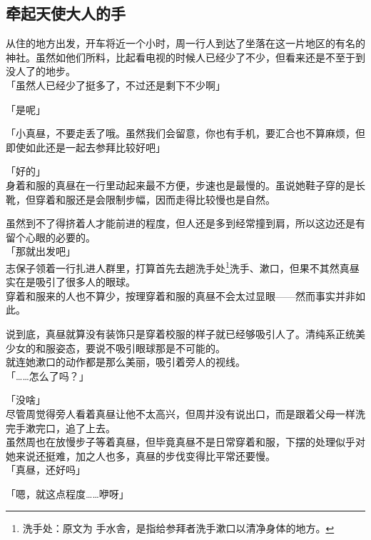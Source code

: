 \subsection{牵起天使大人的手}

从住的地方出发，开车将近一个小时，周一行人到达了坐落在这一片地区的有名的神社。虽然如他们所料，比起看电视的时候人已经少了不少，但看来还是不至于到没人了的地步。\\

「虽然人已经少了挺多了，不过还是剩下不少啊」

「是呢」

「小真昼，不要走丢了哦。虽然我们会留意，你也有手机，要汇合也不算麻烦，但即使如此还是一起去参拜比较好吧」

「好的」\\

身着和服的真昼在一行里动起来最不方便，步速也是最慢的。虽说她鞋子穿的是长靴，但穿着和服还是会限制步幅，因而走得比较慢也是自然。

虽然到不了得挤着人才能前进的程度，但人还是多到经常撞到肩，所以这边还是有留个心眼的必要的。\\

「那就出发吧」\\

志保子领着一行扎进人群里，打算首先去趟洗手处\footnote{洗手处：原文为 {\jpfont 手水舎}，是指给参拜者洗手漱口以清净身体的地方。}洗手、漱口，但果不其然真昼实在是吸引了很多人的眼球。\\

穿着和服来的人也不算少，按理穿着和服的真昼不会太过显眼——然而事实并非如此。

说到底，真昼就算没有装饰只是穿着校服的样子就已经够吸引人了。清纯系正统美少女的和服姿态，要说不吸引眼球那是不可能的。\\

就连她漱口的动作都是那么美丽，吸引着旁人的视线。\\

「……怎么了吗？」

「没啥」\\

尽管周觉得旁人看着真昼让他不太高兴，但周并没有说出口，而是跟着父母一样洗完手漱完口，追了上去。\\

虽然周也在放慢步子等着真昼，但毕竟真昼不是日常穿着和服，下摆的处理似乎对她来说还挺难，加之人也多，真昼的步伐变得比平常还要慢。\\

「真昼，还好吗」

「嗯，就这点程度……咿呀」\\

